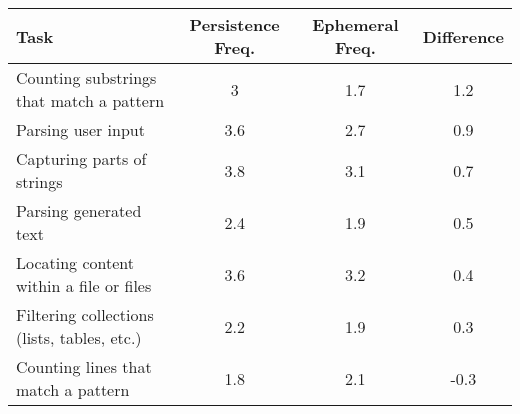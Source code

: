 \begin{adjustbox}{width=\textwidth}
\begin{tabular}{lccc}
\toprule
\textbf{Task} & \textbf{Persistence Freq.} & \textbf{Ephemeral Freq.} & \textbf{Difference} \\  \midrule
Counting  substrings that match a pattern & 3 & 1.7 & 1.2\\  \midrule
Parsing user input & 3.6 & 2.7 & 0.9\\ \midrule
Capturing parts of strings & 3.8 & 3.1 & 0.7\\ \midrule
Parsing generated text & 2.4 & 1.9 & 0.5\\  \midrule
Locating content within a file or files & 3.6 & 3.2 & 0.4\\ \midrule
Filtering collections (lists, tables, etc.) & 2.2 & 1.9 & 0.3\\ \midrule
Counting lines that match a pattern & 1.8 & 2.1 & -0.3\\
\bottomrule
\end{tabular}
\end{adjustbox}
